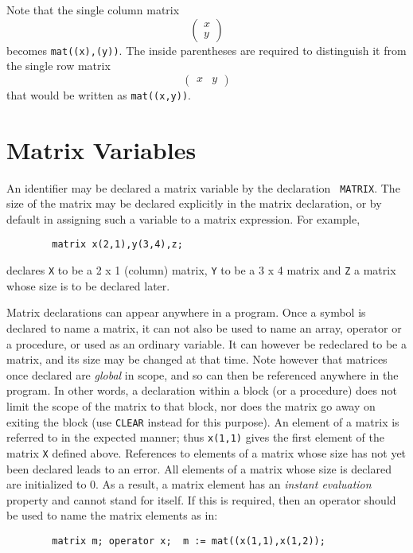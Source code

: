 \documentclass[11pt,letterpaper]{book}
\makeatletter
\newcommand{\underscore}{\_}
\newcommand{\ttindex}[1]{{\renewcommand{\_}{\protect\underscore}%
                          \index{#1@{\tt #1}}}}
\makeatother
\begin{document}
Note that the single column matrix
\[ \left( \begin{array}{c} x \\ y \end{array} \right) \]
becomes {\tt mat((x),(y))}.  The inside parentheses are required to
distinguish it from the single row matrix
\[ \left( \begin{array}{lr} x & y \end{array} \right) \]
that would be written as {\tt mat((x,y))}.

\section{Matrix Variables}

An identifier may be declared a matrix variable by the declaration {\tt
MATRIX}.\ttindex{MATRIX}
The size of the matrix may be declared explicitly in the matrix
declaration, or by default in assigning such a variable to a matrix
expression. For example,
{\small\begin{verbatim}
        matrix x(2,1),y(3,4),z;
\end{verbatim}}
declares {\tt X} to be a 2 x 1 (column) matrix, {\tt Y} to be a 3 x 4
matrix and {\tt Z} a matrix whose size is to be declared later.

Matrix declarations can appear anywhere in a program. Once a symbol is
declared to name a matrix, it can not also be used to name an array,
operator or a procedure, or used as an ordinary variable. It can however
be redeclared to be a matrix, and its size may be changed at that time.
Note however that matrices once declared are {\em global\/} in scope, and so
can then be referenced anywhere in the program.  In other words, a
declaration within a block (or a procedure) does not limit the scope of
the matrix to that block, nor does the matrix go away on exiting the block
(use {\tt CLEAR} instead for this purpose).  An element of a matrix is
referred to in the expected manner; thus {\tt x(1,1)} gives the first
element of the matrix {\tt X} defined above.  References to elements of a
matrix whose size has not yet been declared leads to an error.  All
elements of a matrix whose size is declared are initialized to 0.  As a
result, a matrix element has an {\em instant evaluation\/} property and cannot stand for itself.  If this is required,
then an operator should be used to name the matrix elements as in:
{\small\begin{verbatim}
        matrix m; operator x;  m := mat((x(1,1),x(1,2));
\end{verbatim}}
\end{document}
